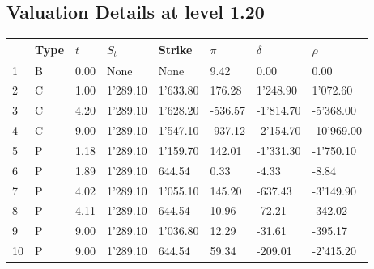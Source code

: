 \documentclass[12pt]{article}
\begin{document}
\begin{center} 
 \subsection{Valuation Details at level 1.20} 
 \par 
 \begin{scriptsize} 
 \begin{tabular}{p{13.1 mm}|p{13.1 mm}|p{13.1 mm}|p{13.1 mm}|p{13.1 mm}|p{13.1 mm}|p{13.1 mm}|p{13.1 mm}} 
          &     Type &      $t$ &    $S_t$ &   Strike &    $\pi$ & $\delta$ &   $\rho$ \\ \hline 
1 & B& 0.00& None& None& 9.42& 0.00& 0.00\\ 
2 & C& 1.00& 1'289.10& 1'633.80& 176.28& 1'248.90& 1'072.60\\ 
3 & C& 4.20& 1'289.10& 1'628.20& -536.57& -1'814.70& -5'368.00\\ 
4 & C& 9.00& 1'289.10& 1'547.10& -937.12& -2'154.70& -10'969.00\\ 
5 & P& 1.18& 1'289.10& 1'159.70& 142.01& -1'331.30& -1'750.10\\ 
6 & P& 1.89& 1'289.10& 644.54& 0.33& -4.33& -8.84\\ 
7 & P& 4.02& 1'289.10& 1'055.10& 145.20& -637.43& -3'149.90\\ 
8 & P& 4.11& 1'289.10& 644.54& 10.96& -72.21& -342.02\\ 
9 & P& 9.00& 1'289.10& 1'036.80& 12.29& -31.61& -395.17\\ 
10 & P& 9.00& 1'289.10& 644.54& 59.34& -209.01& -2'415.20\\ 
\end{tabular} 
  \end{scriptsize} 
 \end{center}%
\end{document}
